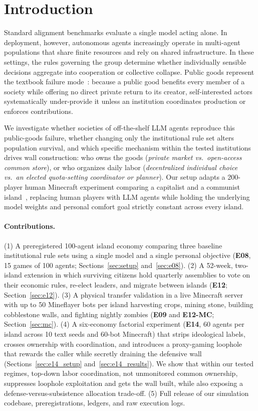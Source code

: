 \documentclass[10pt,letterpaper]{article}
\begin{document}
\section{Introduction}

Standard alignment benchmarks evaluate a single model acting alone. In deployment, however, autonomous agents increasingly operate in multi-agent populations that share finite resources and rely on shared infrastructure. In these settings, the rules governing the group determine whether individually sensible decisions aggregate into cooperation or collective collapse. Public goods represent the textbook failure mode~\cite{samuelson1954,olson1965}: because a public good benefits every member of a society while offering no direct private return to its creator, self-interested actors systematically under-provide it unless an institution coordinates production or enforces contributions.

We investigate whether societies of off-the-shelf LLM agents reproduce this public-goods failure, whether changing only the institutional rule set alters population survival, and which specific mechanism within the tested institutions drives wall construction: who owns the goods (\emph{private market vs.\ open-access common store}), or who organizes daily labor (\emph{decentralized individual choice vs.\ an elected quota-setting coordinator or planner}). Our setup adapts a 200-player human Minecraft experiment comparing a capitalist and a communist island~\cite{jjkay03}, replacing human players with LLM agents while holding the underlying model weights and personal comfort goal strictly constant across every island.

\paragraph{Contributions.}
(1) A preregistered 100-agent island economy comparing three baseline institutional rule sets using a single model and a single personal objective (\textbf{E08}, 15 games of 100 agents; Sections~\ref{sec:setup} and~\ref{sec:e08}).
(2) A 52-week, two-island extension in which surviving citizens hold quarterly assemblies to vote on their economic rules, re-elect leaders, and migrate between islands (\textbf{E12}; Section~\ref{sec:e12}).
(3) A physical transfer validation in a live Minecraft server with up to 50 Mineflayer bots per island harvesting crops, mining stone, building cobblestone walls, and fighting nightly zombies (\textbf{E09} and \textbf{E12-MC}; Section~\ref{sec:mc}).
(4) A six-economy factorial experiment (\textbf{E14}, 60 agents per island across 10 text seeds and 60-bot Minecraft) that strips ideological labels, crosses ownership with coordination, and introduces a proxy-gaming loophole that rewards the caller while secretly draining the defensive wall (Sections~\ref{sec:e14_setup} and~\ref{sec:e14_results}). We show that within our tested regimes, top-down labor coordination, not unmonitored common ownership, suppresses loophole exploitation and gets the wall built, while also exposing a defense-versus-subsistence allocation trade-off.
(5) Full release of our simulation codebase, preregistrations, ledgers, and raw execution logs.
\end{document}
